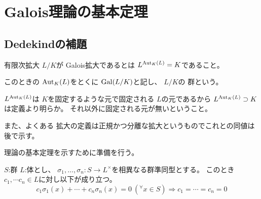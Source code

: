 \documentclass[../master_galois_theory]{subfiles}
\begin{document}
\setcounter{section}{1}

\section{Galois理論の基本定理}

\subsection{Dedekindの補題}

\begin{defi}
  有限次拡大 $L/K$が \rm{Galois}拡大であるとは $L^{\mathrm{Aut}_K(L)} = K$であること。

  このときの $\mathrm{Aut}_K(L)$をとくに $\mathrm{Gal} (L/K)$と記し、 $L/K$の \galois 群という。
\end{defi}

\begin{rem}
  $L^{\mathrm{Aut}_K(L)}$は $K$を固定するような元で固定される $L$の元であるから $L^{\mathrm{Aut}_K(L)} \supset K$は定義より明らか。
  それ以外に固定される元が無いということ。

  また、よくある \galois 拡大の定義は正規かつ分離な拡大というものでこれとの同値は後で示す。
\end{rem}

\galois 理論の基本定理を示すために準備を行う。

\begin{lemm} \label{lemm:grpdedekind}

  $S$:群 $L$:体とし、 $\sigma_1 , \dots , \sigma_n : S \longrightarrow L^\times$を相異なる群準同型とする。
  このとき $c_1 , \cdots c_n \in L$に対し以下が成り立つ。
  \[
  c_1 \sigma_1 (x) + \cdots + c_n \sigma_n (x) = 0 \  ({}^\forall x \in S)
  \Longrightarrow c_1 = \cdots = c_n = 0
  \]

\end{lemm}
\end{document}
